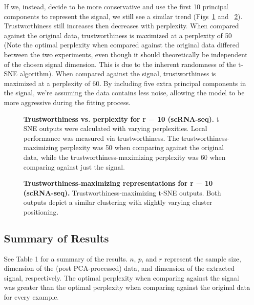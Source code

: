 \documentclass[10pt,letterpaper]{article}
\begin{document}
If we, instead, decide to be more conservative and use the first 10 principal components to represent the signal, we still see a similar trend (Figs~\ref{fig12} and ~\ref{fig13}). Trustworthiness still increases then decreases with perplexity. When compared against the original data, trustworthiness is maximized at a perplexity of 50 (Note the optimal perplexity when compared against the original data differed between the two experiments, even though it should theoretically be independent of the chosen signal dimension. This is due to the inherent randomness of the t-SNE algorithm). When compared against the signal, trustworthiness is maximized at a perplexity of 60. By including five extra principal components in the signal, we're assuming the data contains less noise, allowing the model to be more aggressive during the fitting process.

\begin{figure}[!h]
\caption{{\bf Trustworthiness vs. perplexity for r = 10 (scRNA-seq).}
t-SNE outputs were calculated with varying perplexities. Local performance was measured via trustworthiness. The trustworthiness-maximizing perplexity was 50 when comparing against the original data, while the trustworthiness-maximizing perplexity was 60 when comparing against just the signal.}
\label{fig12}
\end{figure}

\begin{figure}[!h]
\caption{{\bf Trustworthiness-maximizing representations for r = 10 (scRNA-seq).}
Trustworthiness-maximizing t-SNE outputs. Both outputs depict a similar clustering with slightly varying cluster positioning.}
\label{fig13}
\end{figure}

\subsection*{Summary of Results}
See Table 1 for a summary of the results. $n$, $p$, and $r$ represent the sample size, dimension of the (post PCA-processed) data, and dimension of the extracted signal, respectively. The optimal perplexity when comparing against the signal was greater than the optimal perplexity when comparing against the original data for every example.
\end{document}
